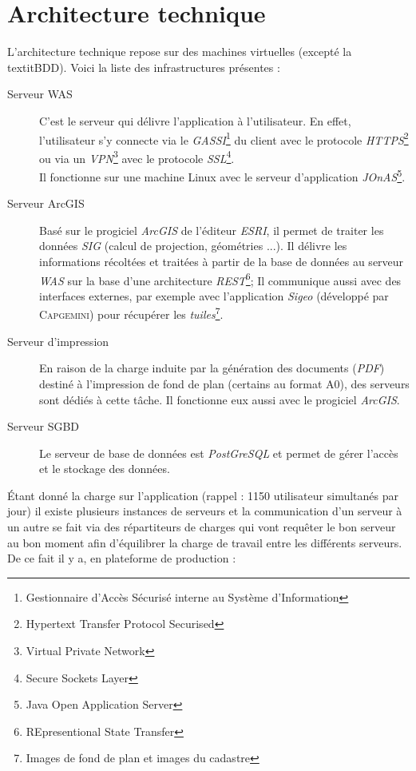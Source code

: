 \section{Architecture technique}
L'architecture technique repose sur des machines virtuelles (excepté la textit{BDD}).
Voici la liste des infrastructures présentes :
\begin{description}
\item[Serveur WAS] C'est le serveur qui délivre l'application à l'utilisateur. En effet, l'utilisateur s'y connecte via le \textit{GASSI}\footnote{Gestionnaire d'Accès Sécurisé interne au Système d'Information} du client avec le protocole \textit{HTTPS}\footnote{Hypertext Transfer Protocol Securised} ou via un \textit{VPN}\footnote{Virtual Private Network} avec le protocole \textit{SSL}\footnote{Secure Sockets Layer}.
\\Il fonctionne sur une machine Linux avec le serveur d'application \textit{JOnAS}\footnote{Java Open Application Server}.
\item[Serveur ArcGIS] Basé sur le progiciel \textit{ArcGIS} de l'éditeur \textit{ESRI}, il permet de traiter les données \textit{SIG} (calcul de projection, géométries ...). Il délivre les informations récoltées et traitées à partir de la base de données au serveur \textit{WAS} sur la base d'une architecture \textit{REST}\footnote{REpresentional State Transfer}; Il communique aussi avec des interfaces externes, par exemple avec l'application \textit{Sigeo} (développé par \textsc{Capgemini}) pour récupérer les \textit{tuiles}\footnote{Images de fond de plan et images du cadastre}.
\item[Serveur d'impression] En raison de la charge induite par la génération des documents (\textit{PDF}) destiné à l'impression de fond de plan (certains au format A0), des serveurs sont dédiés à cette tâche. Il fonctionne eux aussi avec le progiciel \textit{ArcGIS}.
\item[Serveur SGBD] Le serveur de base de données est \textit{PostGreSQL} et permet de gérer l'accès et le stockage des données.\\
\end{description}

\'Etant donné la charge sur l'application (rappel : 1150 utilisateur simultanés par jour) il existe plusieurs instances de serveurs et la communication d'un serveur à un autre se fait via des répartiteurs de charges qui vont requêter le bon serveur au bon moment afin d'équilibrer la charge de travail entre les différents serveurs. De ce fait il y a, en plateforme de production :\\

